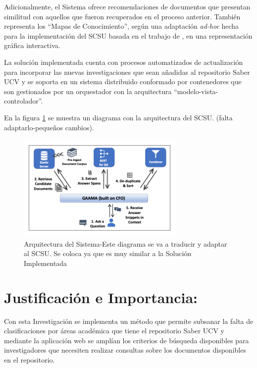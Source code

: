 \documentclass[
  12pt,
  openany]{book}
\begin{document}
Adicionalmente, el Sistema ofrece recomendaciones de documentos que presentan similitud con aquellos que fueron recuperados en el proceso anterior. También representa los ``Mapas de Conocimiento'', según una adaptación \emph{ad-hoc} hecha para la implementación del SCSU basada en el trabajo de \citep{dueñas2011}, en una representación gráfica interactiva.

La solución implementada cuenta con procesos automatizados de actualización para incorporar las nuevas investigaciones que sean añadidas al repositorio Saber UCV y se soporta en un sistema distribuido conformado por contenedores que son gestionados por un orquestador con la arquitectura ``modelo-vista-controlador''.

En la figura \ref{fig:arquitecturasri} se muestra un diagrama con la arquitectura del SCSU. (falta adaptarlo-pequeños cambios).

\begin{figure}

{\centering \includegraphics[width=0.6\linewidth]{images/02-problema/arquitectura_sri} 

}

\caption{Arquitectura del Sistema-Este diagrama se va a traducir y adaptar al SCSU. Se coloca ya que es muy similar a la Solución Implementada}\label{fig:arquitecturasri}
\end{figure}

\hypertarget{justificacion}{%
\section{Justificación e Importancia:}\label{justificacion}}

Con esta Investigación se implementa un método que permite subsanar la falta de clasificaciones por áreas académica que tiene el repositorio Saber UCV y mediante la aplicación web se amplían los criterios de búsqueda disponibles para investigadores que necesiten realizar consultas sobre los documentos disponibles en el repositorio.
\end{document}
